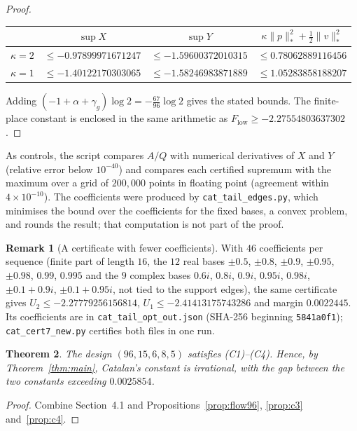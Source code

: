 \documentclass[11pt]{article}
\newtheorem{theorem}{Theorem}
\theoremstyle{definition}
\newtheorem{remark}[theorem]{Remark}
\begin{document}
\begin{proof}
\begin{center}
\begin{tabular}{lccc}
\toprule
 & $\sup X$ & $\sup Y$ & $\kappa\|p\|_*^2+\frac12\|v\|_*^2$\\
\midrule
$\kappa=2$ & $\le-0.97899971671247$ & $\le-1.59600372010315$ & $\le0.78062889116456$\\
$\kappa=1$ & $\le-1.40122170303065$ & $\le-1.58246983871889$ & $\le1.05283858188207$\\
\bottomrule
\end{tabular}
\end{center} Adding $(-1+\alpha+\gamma_g)\log2=-\frac{67}{96}\log2$ gives the stated bounds. The finite-place constant is enclosed in the same arithmetic as $F_{\mathrm{low}}\ge-2.27554803637302$.
\end{proof}

As controls, the script compares $A/Q$ with numerical derivatives of $X$ and $Y$ (relative error below $10^{-40}$) and compares each certified supremum with the maximum over a grid of $200{,}000$ points in floating point (agreement within $4\times10^{-10}$). The coefficients were produced by \texttt{cat\_tail\_edges.py}, which minimises the bound over the coefficients for the fixed bases, a convex problem, and rounds the result; that computation is not part of the proof.

\begin{remark}[A certificate with fewer coefficients]\label{rem:fewer}
With $46$ coefficients per sequence (finite part of length $16$, the $12$ real bases $\pm0.5$, $\pm0.8$, $\pm0.9$, $\pm0.95$, $\pm0.98$, $0.99$, $0.995$ and the $9$ complex bases $0.6i$, $0.8i$, $0.9i$, $0.95i$, $0.98i$, $\pm0.1+0.9i$, $\pm0.1+0.95i$, not tied to the support edges), the same certificate gives $U_2\le-2.27779256156814$, $U_1\le-2.41413175743286$ and margin $0.0022445$. Its coefficients are in \texttt{cat\_tail\_opt\_out.json} (SHA-256 beginning \texttt{5841a0f1}); \texttt{cat\_cert7\_new.py} certifies both files in one run.
\end{remark}

\begin{theorem}\label{thm:second}
The design $(96,15,6,8,5)$ satisfies (C1)--(C4). Hence, by Theorem~\ref{thm:main}, Catalan's constant is irrational, with the gap between the two constants exceeding $0.0025854$.
\end{theorem}

\begin{proof}
Combine Section~4.1 and Propositions~\ref{prop:flow96}, \ref{prop:c3} and~\ref{prop:c4}.
\end{proof}
\end{document}
